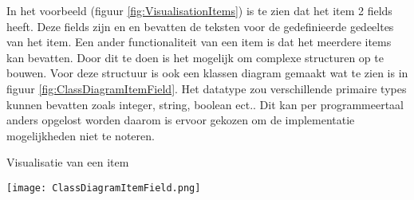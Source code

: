 \whitespace
In het voorbeeld (figuur \ref{fig:VisualisationItems}) is te zien dat het item  2 fields heeft.
Deze fields zijn  en  en bevatten de teksten voor de gedefinieerde gedeeltes van het item.
Een ander functionaliteit van een item is dat het meerdere items kan bevatten. 
Door dit te doen is het mogelijk om complexe structuren op te bouwen.
Voor deze structuur is ook een klassen diagram gemaakt wat te zien is in figuur \ref{fig:ClassDiagramItemField}.
Het datatype  zou verschillende primaire types kunnen bevatten zoals integer, string, boolean ect..
Dit kan per programmeertaal anders opgelost worden daarom is ervoor gekozen om de implementatie mogelijkheden niet te noteren.

\whitespace[2]
\begin{graphic}
    \captionsetup{type=figure}
    \caption{Visualisatie van een item}
    \texttt{[image: ClassDiagramItemField.png]}
    \label{fig:ClassDiagramItemField}
\end{graphic}
%
%
%
%
%
%
